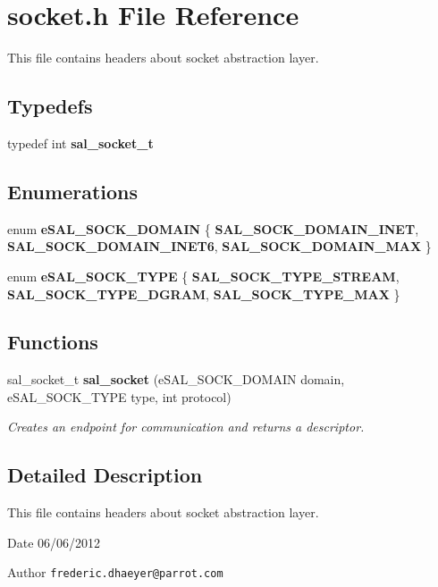 \section{socket.h File Reference}
\label{socket_8h}


This file contains headers about socket abstraction layer.  


\subsection*{Typedefs}
\begin{DoxyCompactItemize}
\item 
typedef int {\bfseries sal\_\-socket\_\-t}\label{socket_8h_a1afb11e91680ecf6edea00e9c837c7dd}

\end{DoxyCompactItemize}
\subsection*{Enumerations}
\begin{DoxyCompactItemize}
\item 
enum {\bfseries eSAL\_\-SOCK\_\-DOMAIN} \{ {\bfseries SAL\_\-SOCK\_\-DOMAIN\_\-INET}, 
{\bfseries SAL\_\-SOCK\_\-DOMAIN\_\-INET6}, 
{\bfseries SAL\_\-SOCK\_\-DOMAIN\_\-MAX}
 \}
\item 
enum {\bfseries eSAL\_\-SOCK\_\-TYPE} \{ {\bfseries SAL\_\-SOCK\_\-TYPE\_\-STREAM}, 
{\bfseries SAL\_\-SOCK\_\-TYPE\_\-DGRAM}, 
{\bfseries SAL\_\-SOCK\_\-TYPE\_\-MAX}
 \}
\end{DoxyCompactItemize}
\subsection*{Functions}
\begin{DoxyCompactItemize}
\item 
sal\_\-socket\_\-t {\bf sal\_\-socket} (eSAL\_\-SOCK\_\-DOMAIN domain, eSAL\_\-SOCK\_\-TYPE type, int protocol)
\begin{DoxyCompactList}\small\item\em Creates an endpoint for communication and returns a descriptor. \end{DoxyCompactList}\end{DoxyCompactItemize}


\subsection{Detailed Description}
This file contains headers about socket abstraction layer. \begin{DoxyDate}{Date}
06/06/2012 
\end{DoxyDate}
\begin{DoxyAuthor}{Author}
{\tt frederic.dhaeyer@parrot.com} 
\end{DoxyAuthor}



